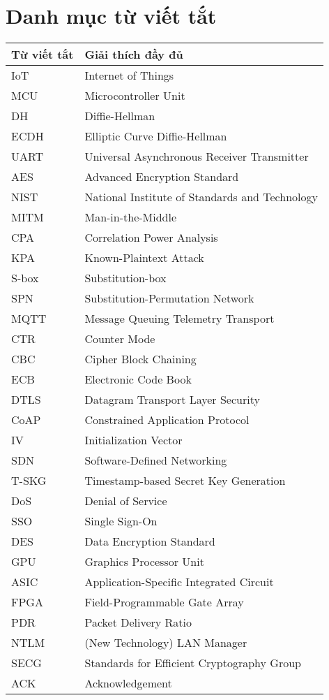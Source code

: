 \chapter*{Danh mục từ viết tắt}
\label{Viết tắt}

\begin{longtable}{|p{4cm}|p{10.5cm}|}
\hline
\textbf{Từ viết tắt} & \textbf{Giải thích đầy đủ} \\
\hline
IoT & Internet of Things \\
\hline
MCU & Microcontroller Unit \\
\hline
DH & Diffie-Hellman \\
\hline
ECDH & Elliptic Curve Diffie-Hellman \\
\hline
UART & Universal Asynchronous Receiver Transmitter \\
\hline
AES & Advanced Encryption Standard \\
\hline
NIST & National Institute of Standards and Technology \\
\hline
MITM & Man-in-the-Middle  \\
\hline
CPA & Correlation Power Analysis  \\
\hline
KPA & Known-Plaintext Attack \\
\hline
S-box & Substitution-box  \\
\hline
SPN & Substitution-Permutation Network \\
\hline
MQTT & Message Queuing Telemetry Transport\\
\hline
CTR & Counter Mode \\
\hline
CBC & Cipher Block Chaining \\
\hline
ECB & Electronic Code Book \\
\hline
DTLS & Datagram Transport Layer Security\\
\hline
CoAP & Constrained Application Protocol  \\
\hline
IV & Initialization Vector \\
\hline
SDN & Software-Defined Networking\\
\hline
T-SKG & Timestamp-based Secret Key Generation\\
\hline
DoS & Denial of Service\\
\hline
SSO & Single Sign-On\\
\hline
DES & Data Encryption Standard \\
\hline
GPU & Graphics Processor Unit\\
\hline
ASIC & Application-Specific Integrated Circuit\\
\hline
FPGA & Field-Programmable Gate Array\\
\hline
PDR & Packet Delivery Ratio\\
\hline
NTLM & (New Technology) LAN Manager\\
\hline
SECG & Standards for Efficient Cryptography Group\\
\hline
ACK & Acknowledgement\\
\hline
\end{longtable}
